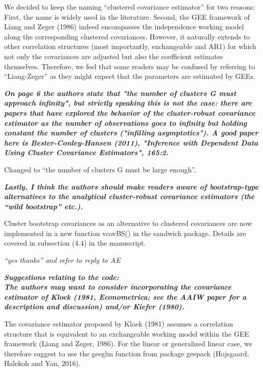 \documentclass[10pt,a4paper]{article}
\begin{document}
\medskip

We decided to keep the naming ``clustered covariance estimator'' for two reasons:
First, the name is widely used in the literature.
Second, the GEE framework of Liang and Zeger (1986) indeed encompasses the independence
working model along the corresponding clustered covariances. However, it naturally extends
to other correlation structures (most importantly, exchangeable and AR1) for which not
only the covariances are adjusted but also the coefficient estimates themselves. Therefore,
we feel that some readers may be confused by referring to ``Liang-Zeger'' as they might
expect that the parameters are estimated by GEEs.

\medskip

\textbf{\textit{
On page 6 the authors state that "the number of clusters G must approach infinity", but strictly speaking this is not the case: there are papers that have explored the behavior of the cluster-robust covariance estimator as the number of observations goes to infinity but holding constant the number of clusters ("infilling asymptotics").  A good paper here is Bester-Conley-Hansen (2011), "Inference with Dependent Data Using Cluster Covariance Estimators", 165:2.
}}

\medskip

Changed to ``the number of clusters G must be large enough''.

\medskip

\textbf{\textit{Lastly, I think the authors should make readers aware of bootstrap-type alternatives to the analytical cluster-robust covariance estimators (the ``wild bootstrap'' etc.).}}

\medskip

Cluster bootstrap covariances as an alternative to clustered covariances are now implemented in a new function vcovBS() in the sandwich package. Details are covered in subsection (4.4) in the manuscript.

\emph{``yes thanks'' and refer to reply to AE}

\medskip

\textbf{\textit{Suggestions relating to the code:
\\
The authors may want to consider incorporating the  covariance estimator of Kloek (1981, Econometrica; see the AAIW paper for a description and discussion) and/or Kiefer (1980).}}

\medskip

The covariance estimator proposed by Kloek (1981) assumes a correlation structure that is equivalent to an exchangeable working model within the GEE framework (Liang and Zeger, 1986).
For the linear or generalized linear case, we therefore suggest to use the geeglm function from package geepack (Hojsgaard, Halekoh and Yan, 2016).
\end{document}

